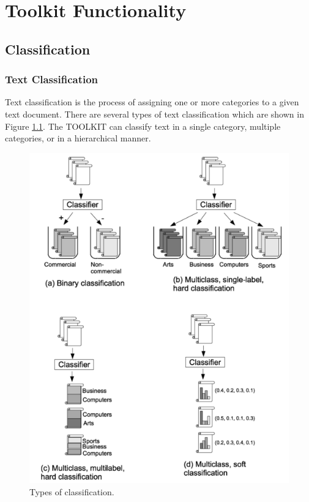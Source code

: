 \documentclass[a4paper,twoside]{book}      %
\begin{document}
\chapter{Toolkit Functionality}
\section{Classification}

\subsection{Text Classification}
Text classification is the process of assigning one or more categories to a given text document. There are several types of text classification which are shown in Figure \ref{fig:typesOfClassification}. The TOOLKIT can classify text in a single category, multiple categories, or in a hierarchical manner.

\begin{figure}
\includegraphics[width=\textwidth]{img/typesOfClassification.png}
\caption{Types of classification\cite{qi2009web}.}
\label{fig:typesOfClassification}
\end{figure}
\end{document}
